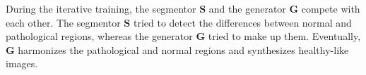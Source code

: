 \documentclass[journal,twoside,web]{ieeecolor}
\begin{document}

During the iterative training, the segmentor $\mathbf{S}$ and the generator $\mathbf{G}$ compete with each other. The segmentor $\mathbf{S}$ tried to detect the differences between normal and pathological regions, whereas the generator $\mathbf{G}$ tried to make up them. Eventually, $\mathbf{G}$ harmonizes the pathological and normal regions and synthesizes healthy-like images.

\end{document}

